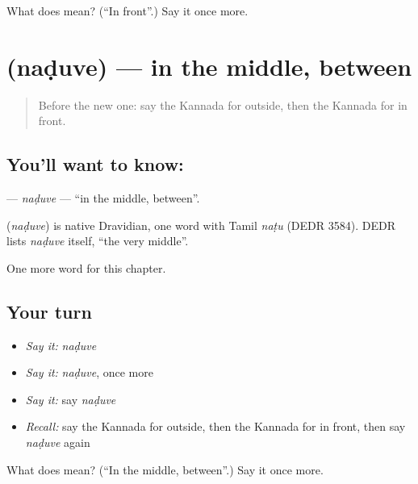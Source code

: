 \begin{tcolorbox}[breakable,colback=teal!4,colframe=teal!35!black,title={Before you move on}]
What does  mean? (\textquotedblleft{}In front\textquotedblright{}.) Say it once more.
\end{tcolorbox}
\section[\texorpdfstring{\kn{ನಡುವೆ} (naḍuve)}{ನಡುವೆ (naḍuve)}]{ (naḍuve) — in the middle, between}

\label{lesson:KA-C108-naduve}



\begin{quote}
Before the new one: say the Kannada for outside, then the Kannada for in front.
\end{quote}

\subsection*{You'll want to know: }
\textbf{} — \emph{naḍuve} — \textquotedblleft{}in the middle, between\textquotedblright{}.

\begin{cousinweb}
\textbf{} (\emph{naḍuve}) is native Dravidian, one word with Tamil \emph{naṭu} (DEDR 3584). DEDR lists \emph{naḍuve} itself, \textquotedblleft{}the very middle\textquotedblright{}.
\end{cousinweb}

\begin{grammarlens}[title={What you've built}]
One more word for this chapter.
\end{grammarlens}

\subsection*{Your turn}
\begin{itemize}
\raggedright
  \item \emph{Say it:} \emph{naḍuve}
  \item \emph{Say it:} \emph{naḍuve}, once more
  \item \emph{Say it:} say \emph{naḍuve}
  \item \emph{Recall:} say the Kannada for outside, then the Kannada for in front, then say \emph{naḍuve} again
\end{itemize}

\begin{tcolorbox}[breakable,colback=teal!4,colframe=teal!35!black,title={Before you move on}]
What does  mean? (\textquotedblleft{}In the middle, between\textquotedblright{}.) Say it once more.
\end{tcolorbox}
